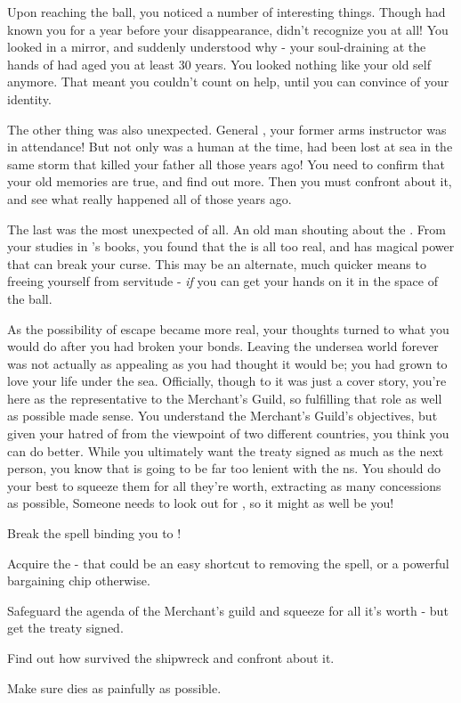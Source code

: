 \documentclass[char]{NeptuneBall}
\begin{document}
Upon reaching the ball, you noticed a number of interesting things. Though \cAriel{} had known you for a year before your disappearance, \cAriel{\they} didn't recognize you at all! You looked in a mirror, and suddenly understood why - your soul-draining at the hands of \cWitch{} had aged you at least 30 years. You looked nothing like your old self anymore. That meant you couldn't count on \cAriel{\their} help, until you can convince \cAriel{\them} of your identity.

The other thing was also unexpected. General \cGeneral{}, your former arms instructor was in attendance! But not only was \cGeneral{\they} a human at the time, \cGeneral{\they} had been lost at sea in the same storm that killed your father all those years ago! You need to confirm that your old memories are true, and find out more. Then you must confront \cGeneral{\them} about it, and see what really happened all of those years ago.

The last was the most unexpected of all. An old man shouting about the \iWishingStone{\MYname}. From your studies in \cWitch{}'s books, you found that the \iWishingStone{\MYname} is all too real, and has magical power that can break your curse. This may be an alternate, much quicker means to freeing yourself from servitude - \emph{if} you can get your hands on it in the space of the ball.

As the possibility of escape became more real, your thoughts turned to what you would do after you had broken your bonds. Leaving the undersea world forever was not actually as appealing as you had thought it would be; you had grown to love your life under the sea. Officially, though to \cWitch{} it was just a cover story, you're here as the representative to the Merchant's Guild, so fulfilling that role as well as possible made sense. You understand the Merchant's Guild's objectives, but given your hatred of \pPacifica{} from the viewpoint of two different countries, you think you can do better. While you ultimately want the treaty signed as much as the next person, you know that \cKing{\King} \cKing{} is going to be far too lenient with the \pPacifica{}ns. You should do your best to squeeze them for all they're worth, extracting as many concessions as possible, Someone needs to look out for \pAtlantis{}, so it might as well be you!

\begin{itemz}[Goals]
	\item Break the spell binding you to \cWitch{}!
	\item Acquire the \iWishingStone{} - that could be an easy shortcut to removing the spell, or a powerful bargaining chip otherwise.
  \item Safeguard the agenda of the Merchant's guild and squeeze \pPacifica{} for all it's worth - but get the treaty signed.
	\item Find out how \cGeneral{} survived the shipwreck and confront \cGeneral{\them} about it.
	\item Make sure \cWitch{} dies as painfully as possible.
\end{itemz}
\end{document}
